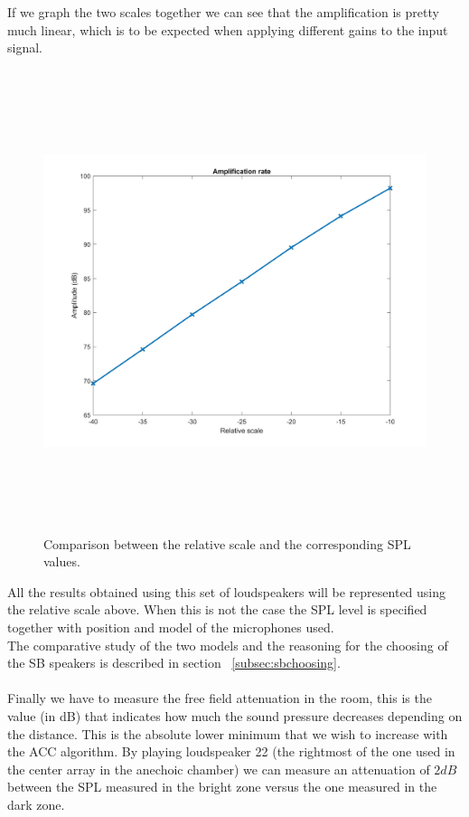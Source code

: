 If we graph the two scales together we can see that the amplification is pretty much linear, which is to be expected when applying different gains to the input signal.

\begin{figure}[H]
\centering
\includegraphics[width=13.5cm,height=13.5cm,keepaspectratio]{Figures/amplification}
\decoRule
\caption[Amplification factors]{Comparison between the relative scale and the corresponding SPL values.}
\label{fig:mics}
\end{figure}

All the results obtained using this set of loudspeakers will be represented using the relative scale above. When this is not the case the SPL level is specified together with position and model of the microphones used.
\\
The comparative study of the two models and the reasoning for the choosing of the SB speakers is described in section ~\ref{subsec:sbchoosing}.
\\
\\
Finally we have to measure the free field attenuation in the room, this is the value (in dB) that indicates how much the sound pressure decreases depending on the distance. This is the absolute lower minimum that we wish to increase with the ACC algorithm. By playing loudspeaker 22 (the rightmost of the one used in the center array in the anechoic chamber) we can measure an attenuation of \tld$2dB$ between the SPL measured in the bright zone versus the one measured in the dark zone. 

